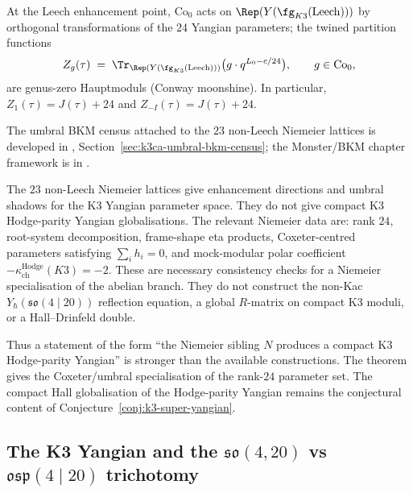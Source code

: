 \begin{conjecture}
\label{conj:conway-moonshine-yangian}
\ClaimStatusConjectured
At the Leech enhancement point, $\mathrm{Co}_0$ acts on
$\Rep(Y(\fg_{K3}(\mathrm{Leech})))$ by orthogonal transformations of
the $24$ Yangian parameters; the twined partition functions
\[
Z_g(\tau) \;=\; \Tr_{\Rep(Y(\fg_{K3}(\mathrm{Leech})))}
\bigl(g\cdot q^{L_0 - c/24}\bigr), \qquad g\in\mathrm{Co}_0,
\]
are genus-zero Hauptmoduls (Conway moonshine). In particular,
$Z_1(\tau) = J(\tau)+24$ and $Z_{-I}(\tau) = J(\tau)+24$.
\end{conjecture}

The umbral BKM census attached to the $23$ non-Leech Niemeier lattices
is developed in
\cite{VolI},
Section~\ref{sec:k3ca-umbral-bkm-census}; the Monster/BKM chapter
framework is in
\cite{VolI}.

\begin{remark}
\label{rem:k3yang-niemeier-not-hosts}
The \(23\) non-Leech Niemeier lattices give enhancement directions and
umbral shadows for the K3 Yangian parameter space. They do not give
compact K3 Hodge-parity Yangian globalisations. The relevant Niemeier
data are: rank \(24\), root-system decomposition,
frame-shape eta products, Coxeter-centred parameters satisfying
\(\sum_i h_i=0\), and mock-modular polar coefficient
\(-\kappa_{\mathrm{ch}}^{\mathrm{Hodge}}(K3)=-2\). These are necessary consistency
checks for a Niemeier specialisation of the abelian branch. They do
not construct the non-Kac \(Y_\hbar(\mathfrak{so}(4\mid20))\)
reflection equation, a global \(R\)-matrix on compact K3 moduli, or a
Hall--Drinfeld double.

Thus a statement of the form ``the Niemeier sibling \(N\) produces a
compact K3 Hodge-parity Yangian'' is stronger than the available
constructions. The theorem gives the Coxeter/umbral
specialisation of the rank-\(24\) parameter set. The compact Hall
globalisation of the Hodge-parity Yangian remains the conjectural
content of Conjecture~\ref{conj:k3-super-yangian}.
\end{remark}



\subsection{The K3 Yangian and the \texorpdfstring{$\mathfrak{so}(4,20)$}{so(4,20)} vs \texorpdfstring{$\mathfrak{osp}(4 \mid 20)$}{osp(4|20)} trichotomy}
\label{subsec:k3-super-yangian}

